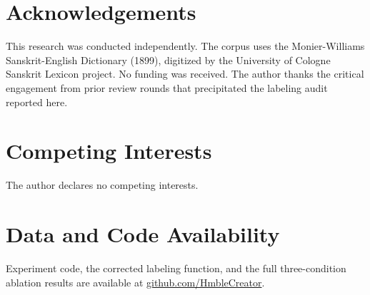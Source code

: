\documentclass{article}
\begin{document}
\section*{Acknowledgements}

This research was conducted independently. The corpus uses the
Monier-Williams Sanskrit-English Dictionary (1899), digitized by the
University of Cologne Sanskrit Lexicon project. No funding was received.
The author thanks the critical engagement from prior review rounds
that precipitated the labeling audit reported here.

\section*{Competing Interests}
The author declares no competing interests.

\section*{Data and Code Availability}
Experiment code, the corrected labeling function, and the full three-condition
ablation results are available at
\href{https://github.com/HmbleCreator}{github.com/HmbleCreator}.
\end{document}
